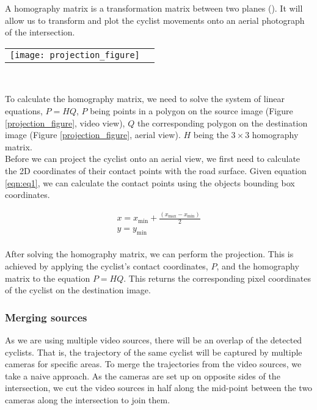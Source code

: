 A homography matrix is a transformation matrix between two planes (\cite{hartley_zisserman_2004}).
It will allow us to transform and plot the cyclist movements onto an aerial photograph of 
the intersection.
\ \\ 

\noindent
\begin{tabular}{@{}cc}
\texttt{[image: projection\_figure]} 
\end{tabular}
\label{projection_figure}
\

To calculate the homography matrix, we need to solve the system of linear equations, $P = HQ$,
$P$ being points in a polygon on the source image (Figure \ref{projection_figure}, video view), $Q$ the corresponding polygon on the destination image (Figure \ref{projection_figure}, aerial view). 
$H$ being the $3 \times 3$ homography matrix.
\ \\

Before we can project the cyclist onto an aerial view, we first need to calculate the 2D coordinates of their contact points with the road surface.
Given equation \ref{eqn:eq1}, we can calculate the contact points using the objects bounding box coordinates.

\begin{equation}
\label{eqn:eq1}
\begin{array}{l}
x = x_\mathrm{min} + \frac{(x_\mathrm{max} - x_\mathrm{min})}{2} \\
y = y_\mathrm{min}
\end{array}
\end{equation}
\ \\

After solving the homography matrix, we can perform the projection.
This is achieved by applying the cyclist's contact coordinates, $P$, and the homography matrix to the equation $P = HQ$. 
This returns the corresponding pixel coordinates of the cyclist on the destination image.

\subsubsection{Merging sources}
As we are using multiple video sources, there will be an overlap of the detected cyclists. 
That is, the trajectory of the same cyclist will be captured by multiple cameras for specific areas. 
To merge the trajectories from the video sources, we take a naive approach. As the cameras are set up on
opposite sides of the intersection, we cut the video sources in half along the mid-point between
the two cameras along the intersection to join them.

